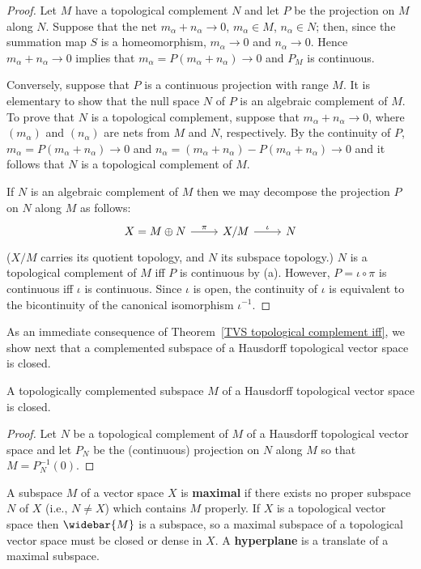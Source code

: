 \begin{proof}
Let $M$ have a topological complement $N$ and let $P$ be the projection on $M$ along $N$. Suppose that the net $m_\alpha+n_\alpha\to 0$, $m_\alpha\in M$, $n_\alpha\in N$; then, since the summation map $S$ is a homeomorphism, $m_\alpha\to 0$ and $n_\alpha\to 0$. Hence $m_\alpha+n_\alpha\to 0$ implies that $m_\alpha=P(m_\alpha+n_\alpha)\to 0$ and $P_M$ is continuous.\par
Conversely, suppose that $P$ is a continuous projection with range $M$. It is elementary to show that the null space $N$ of $P$ is an algebraic complement of $M$. To prove that $N$ is a topological complement, suppose that $m_\alpha+n_\alpha\to 0$, where $(m_\alpha)$ and $(n_\alpha)$ are nets from $M$ and $N$, respectively. By the continuity of $P$, $m_\alpha=P(m_\alpha+n_\alpha)\to 0$ and $n_\alpha=(m_\alpha+n_\alpha)-P(m_\alpha+n_\alpha)\to 0$ and it follows that $N$ is a topological complement of $M$.\par
If $N$ is an algebraic complement of $M$ then we may decompose the projection $P$ on $N$ along $M$ as follows:
\[\begin{tikzcd}
X=M\oplus N\ar[r,"\pi"]&X/M\ar[r,"\iota"]&N
\end{tikzcd}\]
($X/M$ carries its quotient topology, and $N$ its subspace topology.) $N$ is a topological complement of $M$ iff $P$ is continuous by (a). However, $P=\iota\circ\pi$ is continuous iff $\iota$ is continuous. Since $\iota$ is open, the continuity of $\iota$ is equivalent to the bicontinuity of the canonical isomorphism $\iota^{-1}$.
\end{proof}
As an immediate consequence of Theorem~\ref{TVS topological complement iff}, we show next that a complemented subspace of a Hausdorff topological vector space is closed.
\begin{corollary}
A topologically complemented subspace $M$ of a Hausdorff topological vector space is closed.
\end{corollary}
\begin{proof}
Let $N$ be a topological complement of $M$ of a Hausdorff topological vector space and let $P_N$ be the (continuous) projection on $N$ along $M$ so that $M=P_N^{-1}(0)$.
\end{proof}
A subspace $M$ of a vector space $X$ is \textbf{maximal} if there exists no proper subspace $N$ of $X$ (i.e., $N\neq X$) which contains $M$ properly. If $X$ is a topological vector space then $\widebar{M}$ is a subspace, so a maximal subspace of a topological vector space must be closed or dense in $X$. A \textbf{hyperplane} is a translate of a maximal subspace.
